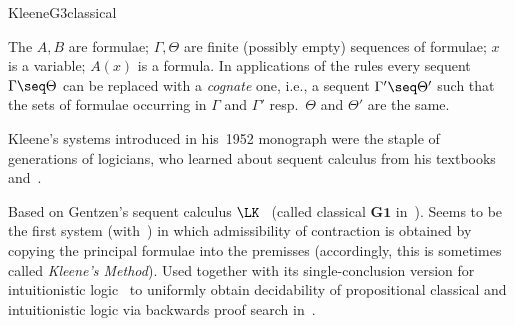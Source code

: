 \begin{entry}{KleeneG3classical}
\begin{clarifications}
  The $A,B$ are formulae; $\Gamma,\Theta$ are finite (possibly empty)
  sequences of formulae; $x$ is a variable; $A(x)$ is a formula. In
  applications of the rules every sequent $\Gamma \seq \Theta$ can be
  replaced with a \emph{cognate} one, i.e., a sequent
  $\Gamma' \seq \Theta'$ such that the sets of formulae occurring in
  $\Gamma$ and $\Gamma'$ resp.\ $\Theta$ and $\Theta'$ are the same.
\end{clarifications}

\begin{history}
  Kleene's systems introduced in his~1952 monograph were the staple of
  generations of logicians, who learned about sequent calculus from
  his textbooks~\cite{Kleene:1952} and~\cite{Kleene:1967}.
\end{history}

\begin{technicalities}
  Based on Gentzen's sequent calculus $\LK$~ (called
  classical $\mathbf{G1}$ in~\cite{Kleene:1952}). Seems to be the
  first system (with~) in which
  admissibility of contraction is obtained by copying the principal
  formulae into the premisses (accordingly, this is sometimes called
  \emph{Kleene's Method}). Used together with its single-conclusion
  version for intuitionistic logic~ to
  uniformly obtain decidability of propositional classical and
  intuitionistic logic via backwards proof search
  in~\cite{Kleene:1952}.
\end{technicalities}









\nocite{Kleene:1952}



\end{entry}
